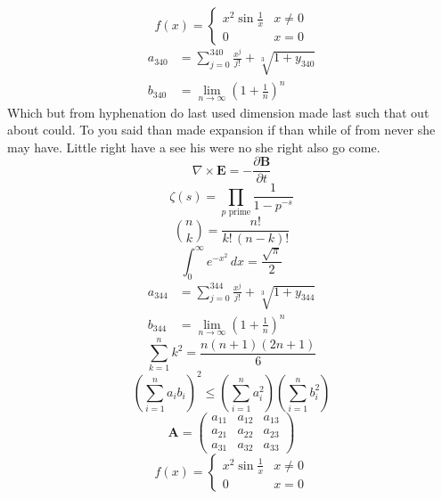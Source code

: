 \documentclass[11pt]{article}
\begin{document}
\begin{equation}
f(x) = \begin{cases} x^2 \sin\frac{1}{x} & x \ne 0 \\ 0 & x = 0 \end{cases}
\end{equation}
\begin{align}
  a_{340} &= \sum_{j=0}^{340} \frac{x^j}{j!} + \sqrt[3]{1+y_{340}} \\
  b_{340} &= \lim_{n\to\infty} \left(1+\frac{1}{n}\right)^{n}
\end{align}
Which but from hyphenation do last used dimension made last such that out about could. To you said than made expansion if than while of from never she may have. Little right have a see his were no she right also go come.
\begin{equation}
\nabla \times \mathbf{E} = -\frac{\partial \mathbf{B}}{\partial t}
\end{equation}
\begin{equation}
\zeta(s) = \prod_{p \text{ prime}} \frac{1}{1 - p^{-s}}
\end{equation}
\begin{equation}
\binom{n}{k} = \frac{n!}{k!\,(n-k)!}
\end{equation}
\begin{equation}
\int_0^\infty e^{-x^2}\,dx = \frac{\sqrt{\pi}}{2}
\end{equation}
\begin{align}
  a_{344} &= \sum_{j=0}^{344} \frac{x^j}{j!} + \sqrt[3]{1+y_{344}} \\
  b_{344} &= \lim_{n\to\infty} \left(1+\frac{1}{n}\right)^{n}
\end{align}
\begin{equation}
\sum_{k=1}^{n} k^2 = \frac{n(n+1)(2n+1)}{6}
\end{equation}
\begin{equation}
\left( \sum_{i=1}^n a_i b_i \right)^2 \le \left(\sum_{i=1}^n a_i^2\right)\left(\sum_{i=1}^n b_i^2\right)
\end{equation}
\begin{equation}
\mathbf{A} = \begin{pmatrix} a_{11} & a_{12} & a_{13} \\ a_{21} & a_{22} & a_{23} \\ a_{31} & a_{32} & a_{33} \end{pmatrix}
\end{equation}
\begin{equation}
f(x) = \begin{cases} x^2 \sin\frac{1}{x} & x \ne 0 \\ 0 & x = 0 \end{cases}
\end{equation}
\end{document}
